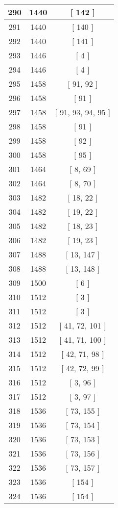 \begin{center}
\begin{longtable}[H]{|| c c c ||}
\hline
290 & 1440 & [ 142 ] \\ 
\hline
291 & 1440 & [ 140 ] \\ 
\hline
292 & 1440 & [ 141 ] \\ 
\hline
293 & 1446 & [ 4 ] \\ 
\hline
294 & 1446 & [ 4 ] \\ 
\hline
295 & 1458 & [ 91, 92 ] \\ 
\hline
296 & 1458 & [ 91 ] \\ 
\hline
297 & 1458 & [ 91, 93, 94, 95 ] \\ 
\hline
298 & 1458 & [ 91 ] \\ 
\hline
299 & 1458 & [ 92 ] \\ 
\hline
300 & 1458 & [ 95 ] \\ 
\hline
301 & 1464 & [ 8, 69 ] \\ 
\hline
302 & 1464 & [ 8, 70 ] \\ 
\hline
303 & 1482 & [ 18, 22 ] \\ 
\hline
304 & 1482 & [ 19, 22 ] \\ 
\hline
305 & 1482 & [ 18, 23 ] \\ 
\hline
306 & 1482 & [ 19, 23 ] \\ 
\hline
307 & 1488 & [ 13, 147 ] \\ 
\hline
308 & 1488 & [ 13, 148 ] \\ 
\hline
309 & 1500 & [ 6 ] \\ 
\hline
310 & 1512 & [ 3 ] \\ 
\hline
311 & 1512 & [ 3 ] \\ 
\hline
312 & 1512 & [ 41, 72, 101 ] \\ 
\hline
313 & 1512 & [ 41, 71, 100 ] \\ 
\hline
314 & 1512 & [ 42, 71, 98 ] \\ 
\hline
315 & 1512 & [ 42, 72, 99 ] \\ 
\hline
316 & 1512 & [ 3, 96 ] \\ 
\hline
317 & 1512 & [ 3, 97 ] \\ 
\hline
318 & 1536 & [ 73, 155 ] \\ 
\hline
319 & 1536 & [ 73, 154 ] \\ 
\hline
320 & 1536 & [ 73, 153 ] \\ 
\hline
321 & 1536 & [ 73, 156 ] \\ 
\hline
322 & 1536 & [ 73, 157 ] \\ 
\hline
323 & 1536 & [ 154 ] \\ 
\hline
324 & 1536 & [ 154 ] \\ 
\hline

\end{longtable}
\end{center}

